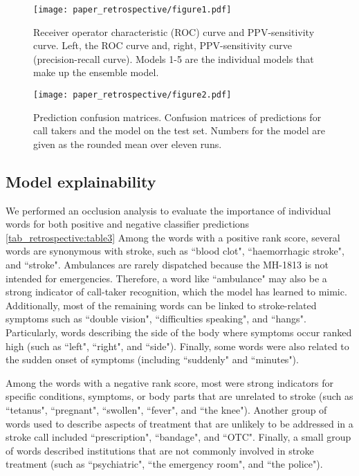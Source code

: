 {\begin{figure}[t]
    \centering
    \texttt{[image: paper\_retrospective/figure1.pdf]}
    \caption[Receiver operator characteristic (ROC) curve and PPV-sensitivity curve for stroke recognition.]{Receiver operator characteristic (ROC) curve and PPV-sensitivity curve. Left, the ROC curve and, right, PPV-sensitivity curve (precision-recall curve). Models 1-5 are the individual models that make up the ensemble model.}
    \label{fig_retrospective:figure1}
\end{figure}

\begin{figure}[t]
    \centering
    \texttt{[image: paper\_retrospective/figure2.pdf]}
    \caption[Prediction confusion matrices for stroke recognition.]{Prediction confusion matrices. Confusion matrices of predictions for call takers and the model on the test set. Numbers for the model are given as the rounded mean over eleven runs.}
    \label{fig_retrospective:figure2}
\end{figure}


\subsection{Model explainability}

We performed an occlusion analysis to evaluate the importance of individual words for both positive and negative classifier predictions \cref{tab_retrospective:table3}
Among the words with a positive rank score, several words are synonymous with stroke, such as ``blood clot", ``haemorrhagic stroke", and ``stroke". Ambulances are rarely dispatched because the MH-1813 is not intended for emergencies. Therefore, a word like ``ambulance" may also be a strong indicator of call-taker recognition, which the model has learned to mimic. Additionally, most of the remaining words can be linked to stroke-related symptoms such as ``double vision", ``difficulties speaking", and ``hangs". Particularly, words describing the side of the body where symptoms occur ranked high (such as ``left", ``right", and ``side"). Finally, some words were also related to the sudden onset of symptoms (including ``suddenly" and ``minutes").

Among the words with a negative rank score, most were strong indicators for specific conditions, symptoms, or body parts that are unrelated to stroke (such as ``tetanus", ``pregnant", ``swollen", ``fever", and ``the knee"). Another group of words used to describe aspects of treatment that are unlikely to be addressed in a stroke call included ``prescription", ``bandage", and ``OTC". Finally, a small group of words described institutions that are not commonly involved in stroke treatment (such as ``psychiatric", ``the emergency room", and ``the police").

}
